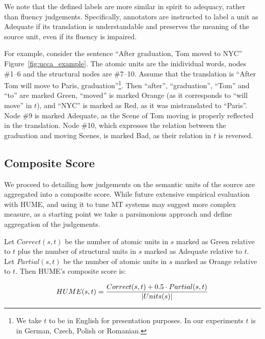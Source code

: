 \documentclass[11pt]{article}
\newcommand{\figref}[1]{Figure~\ref{#1}}
\begin{document}
We note that the defined labels are more similar in spirit to adequacy,
rather than fluency judgements. Specifically, annotators are instructed to
label a unit as Adequate if its translation is understandable and preserves
the meaning of the source unit, even if its fluency is impaired.

For example, consider the sentence ``After graduation, Tom moved
to NYC'' \figref{fig:ucca_example}. The atomic units are the inidividual words,
nodes \#1--6 and the structural nodes are \#7--10. Assume that the translation
is ``After Tom will move to Paris, graduation''\footnote{We take $t$ to
  be in English for presentation purposes. In our experiments $t$ is in German,
  Czech, Polish or Romanian.}.
Then ``after'', ``graduation'', ``Tom'' and ``to'' are marked Green, ``moved'' is marked
Orange (as it corresponds to ``will move'' in $t$), and ``NYC''
is marked as Red, as it was mistranslated to ``Paris''. Node \#9 is marked Adequate,
as the Scene of Tom moving is properly reflected in the translation. Node \#10, which
expresses the relation between the graduation and moving Scenes, is marked Bad,
as their relation in $t$ is reversed.



\subsection{Composite Score}\label{sec:score}

We proceed to detailing how judgements on the semantic units
of the source are aggregated into a composite score.
While future extensive empirical evaluation with HUME, and using it to
tune MT systems may suggest more complex measure,
as a starting point we take a parsimonious approach
and define aggregation of the judgements.

Let $Correct(s,t)$ be the number of atomic units in $s$ marked as Green relative to $t$ plus
the number of structural units in $s$ marked as Adequate relative to $t$.
Let $Partial(s,t)$ be the number of atomic units in $s$ marked as Orange relative
to $t$. Then HUME's composite score is:

\vspace{-.5cm}
\begin{equation}
  \small
  HUME(s,t) = \frac{Correct(s,t) + 0.5\cdot Partial(s,t)}{|Units(s)|}
\end{equation}



\end{document}
